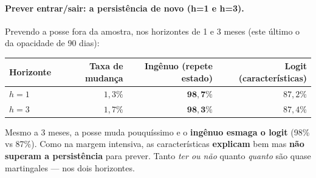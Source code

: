 \documentclass[11pt]{article}
\begin{document}
\paragraph{Prever entrar/sair: a persistência de novo (h=1 e h=3).} Prevendo a posse
fora da amostra, nos horizontes de 1 e 3 meses (este último o da opacidade de 90 dias):

\begin{table}[h]\centering
\begin{tabular}{@{}lrrr@{}}
\toprule
Horizonte & Taxa de mudança & Ingênuo (repete estado) & Logit (características) \\
\midrule
$h=1$ & $1{,}3\%$ & $\mathbf{98{,}7\%}$ & $87{,}2\%$ \\
$h=3$ & $1{,}7\%$ & $\mathbf{98{,}3\%}$ & $87{,}4\%$ \\
\bottomrule
\end{tabular}
\end{table}
\noindent Mesmo a 3 meses, a posse muda pouquíssimo e o \textbf{ingênuo esmaga o logit}
(98\% vs 87\%). Como na margem intensiva, as características \textbf{explicam} bem mas
\textbf{não superam a persistência} para prever. Tanto \emph{ter ou não} quanto
\emph{quanto} são quase martingales --- nos dois horizontes.
\end{document}
